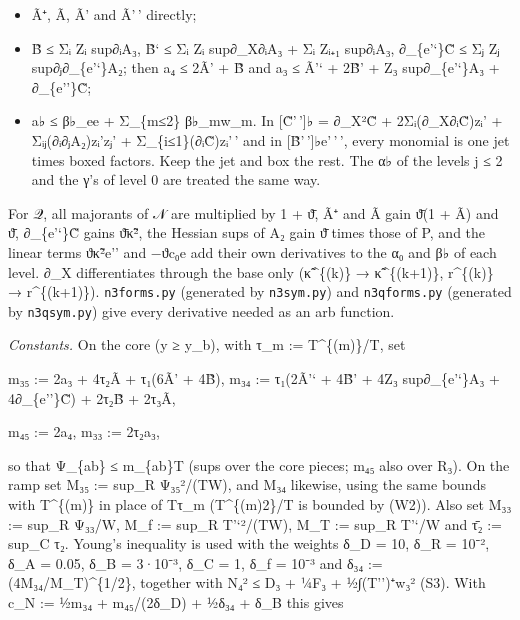 \documentclass[
]{article}
\providecommand{\tightlist}{%
  \setlength{\itemsep}{0pt}\setlength{\parskip}{0pt}}
\begin{document}
\begin{itemize}
\tightlist
\item
  Ã⁺, \textbar Ã\textbar, \textbar Ã'\textbar{} and
  \textbar Ã'\,'\textbar{} directly;
\item
  \textbar B̃\textbar{} ≤ Σᵢ Zᵢ sup\textbar∂ᵢA₃\textbar,
  \textbar B̃`\textbar{} ≤ Σᵢ Zᵢ sup\textbar∂\_X∂ᵢA₃\textbar{} + Σᵢ Zᵢ₊₁
  sup\textbar∂ᵢA₃\textbar, \textbar∂\_\{e'`\}C̃\textbar{} ≤ Σⱼ Zⱼ
  sup\textbar∂ⱼ∂\_\{e'`\}A₂\textbar; then \textbar a₄\textbar{} ≤
  2\textbar Ã'\textbar{} + \textbar B̃\textbar{} and
  \textbar a₃\textbar{} ≤ \textbar Ã'`\textbar{} +
  2\textbar B̃'\textbar{} + Z₃ sup\textbar∂\_\{e'`\}A₃\textbar{} +
  \textbar∂\_\{e''\}C̃\textbar;
\item
  \textbar a♭\textbar{} ≤ β♭\_e\textbar e\textbar{} + Σ\_\{m≤2\}
  β♭\_m\textbar w\_m\textbar. In {[}C̃'\,'{]}♭ = ∂\_X²C̃ + 2Σᵢ(∂\_X∂ᵢC̃)zᵢ'
  + Σᵢⱼ(∂ᵢ∂ⱼA₂)zᵢ'zⱼ' + Σ\_\{i≤1\}(∂ᵢC̃)zᵢ'\,' and in
  {[}B̃'\,'{]}♭e'\,'\,', every monomial is one jet times boxed factors.
  Keep the jet and box the rest. The α♭ of the levels j ≤ 2 and the γ's
  of level 0 are treated the same way.
\end{itemize}

For 𝒬, all majorants of 𝒩 are multiplied by 1 + ϑ̄, Ã⁺ and
\textbar Ã\textbar{} gain ϑ̄(1 + \textbar Ã\textbar) and ϑ̄,
\textbar∂\_\{e'`\}C̃\textbar{} gains ϑ̄κ̃², the Hessian sups of A₂ gain ϑ̄
times those of P, and the linear terms ϑκ̃²e'' and −ϑc₀e add their own
derivatives to the α₀ and β♭ of each level. ∂\_X differentiates through
the base only (κ̃\^{}\{(k)\} → κ̃\^{}\{(k+1)\}, r\^{}\{(k)\} →
r\^{}\{(k+1)\}). \texttt{n3forms.py} (generated by \texttt{n3sym.py})
and \texttt{n3qforms.py} (generated by \texttt{n3qsym.py}) give every
derivative needed as an arb function.

\emph{Constants.} On the core (y ≥ y\_b), with τ\_m := T\^{}\{(m)\}/T,
set

m₃₅ := 2\textbar a₃\textbar{} + 4\textbar τ₂\textbar\textbar Ã\textbar{}
+ \textbar τ₁\textbar(6\textbar Ã'\textbar{} + 4\textbar B̃\textbar), m₃₄
:= \textbar τ₁\textbar(2\textbar Ã'`\textbar{} + 4\textbar B̃'\textbar{}
+ 4Z₃ sup\textbar∂\_\{e'`\}A₃\textbar{} + 4\textbar∂\_\{e''\}C̃\textbar)
+ 2\textbar τ₂\textbar\textbar B̃\textbar{} +
2\textbar τ₃\textbar\textbar Ã\textbar,

m₄₅ := 2\textbar a₄\textbar, m₃₃ :=
2\textbar τ₂\textbar\textbar a₃\textbar,

so that \textbar Ψ\_\{ab\}\textbar{} ≤ m\_\{ab\}T (sups over the core
pieces; m₄₅ also over R₃). On the ramp set M₃₅ := sup\_R Ψ₃₅²/(TW), and
M₃₄ likewise, using the same bounds with T\^{}\{(m)\} in place of Tτ\_m
(T\^{}\{(m)2\}/T is bounded by (W2)). Also set M₃₃ := sup\_R
\textbar Ψ₃₃\textbar/W, M\_f := sup\_R T'`²/(TW), M\_T := sup\_R
\textbar T'`\textbar/W and τ̄₂ := sup\_C \textbar τ₂\textbar. Young's
inequality is used with the weights δ\_D = 10, δ\_R = 10⁻², δ\_A = 0.05,
δ\_B = 3·10⁻³, δ\_C = 1, δ\_f = 10⁻³ and δ₃₄ := (4M₃₄/M\_T)\^{}\{1/2\},
together with N₄² ≤ D₃ + ¼F₃ + ½∫(T'')⁺w₃² (S3). With c\_N := ½m₃₄ +
m₄₅/(2δ\_D) + ½δ₃₄ + δ\_B this gives
\end{document}
